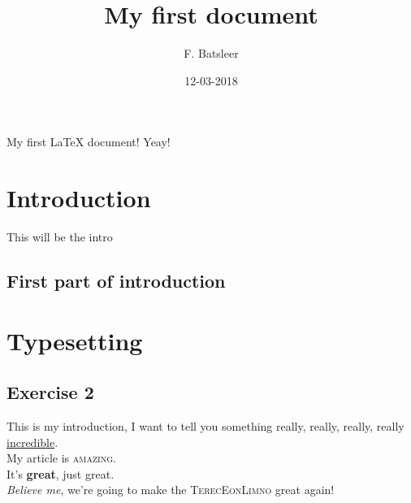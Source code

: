 \documentclass[a4paper,12pt]{article}
\begin{document}
\title{My first document}
\author[1]{F. Batsleer}
\date{12-03-2018}
\maketitle



\tableofcontents
\clearpage
My first \LaTeX{} document! Yeay!\\
\section{Introduction}
This will be the intro
\subsection{First part of introduction}

\section{Typesetting}
\subsection{Exercise 2}
This is my {\huge introduction}, I want to tell you something {\tiny really}, {\small really}, really, {\color{orange} \Large really}  \underline{incredible}.\\
My article is \textsc{amazing}.\\
It's \textbf{great}, just great.\\
\textit{Believe me}, we're going to make the \textsc{\color{green} TerecEonLimno} great again!\\
\end{document}
